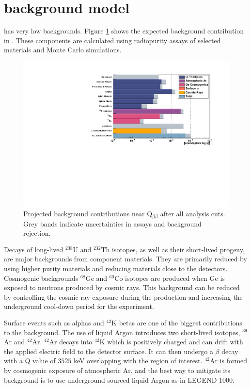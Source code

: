 

\section{{\Ltwo} background model}

{\Ltwo} has very low backgrounds. Figure \ref{fig:L200_background} shows the expected background contribution in {\Ltwo}. These components are calculated using radiopurity assays of selected materials and Monte Carlo simulations. 

\begin{figure}[!htb]
\centering
  \includegraphics[width=0.8\linewidth]{ch2/figs/L200_background.pdf}
  \caption{{\Ltwo} Projected background contributions near Q$_{\beta\beta}$ after all analysis cuts. Grey bands indicate uncertainties in assays and background rejection.}
\label{fig:L200_background}
  \end{figure}


  
Decays of long-lived $^{238}$U and $^{232}$Th isotopes, as well as their short-lived progeny, are major backgrounds from component materials. They are primarily reduced by using higher purity materials and reducing materials close to the detectors. Cosmogenic backgrounds $^{68}$Ge and $^{60}$Co isotopes are produced when Ge is exposed to neutrons produced by cosmic rays. This background can be reduced by controlling the cosmic-ray exposure during the production and increasing the underground cool-down period for the experiment. 

Surface events such as alphas and $^{42}$K betas are one of the biggest contributions to the background. The use of liquid Argon introduces two short-lived isotopes, $^{39}$Ar and $^{42}$Ar.  $^{42}$Ar decays into $^{42}$K which is positively charged and can drift with the applied electric field to the detector surface. It can then undergo a $\beta$ decay with a Q value of $3525$ keV overlapping with the region of interest. $^{42}$Ar is formed by cosmogenic exposure of atmospheric Ar, and the best way to mitigate its background is to use underground-sourced liquid Argon as in LEGEND-1000.

